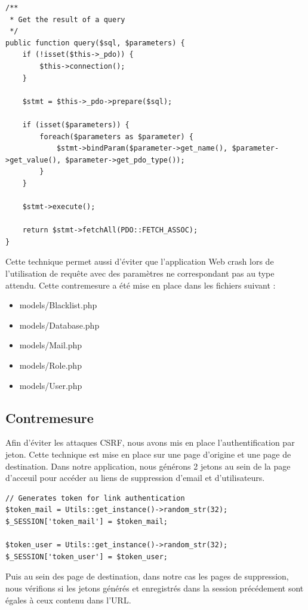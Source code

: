 \documentclass[12pt]{article}
\begin{document}
\begin{lstlisting}[style=JAVA]
/**
 * Get the result of a query
 */
public function query($sql, $parameters) {
    if (!isset($this->_pdo)) {
        $this->connection();
    }

    $stmt = $this->_pdo->prepare($sql);
    
    if (isset($parameters)) {
        foreach($parameters as $parameter) {
            $stmt->bindParam($parameter->get_name(), $parameter->get_value(), $parameter->get_pdo_type());
        }
    }

    $stmt->execute();

    return $stmt->fetchAll(PDO::FETCH_ASSOC);
}
\end{lstlisting}

Cette technique permet aussi d'éviter que l'application Web crash lors de l'utilisation de requête avec des paramètres ne correspondant pas au type attendu.
Cette contremesure a été mise en place dans les fichiers suivant :

\begin{itemize}
\item models/Blacklist.php
\item models/Database.php
\item models/Mail.php
\item models/Role.php
\item models/User.php
\end{itemize}

\newpage
\subsection{Contremesure}\label{c4_1}

Afin d'éviter les attaques CSRF, nous avons mis en place l'authentification par jeton. Cette technique est mise en place sur une page d'origine et une page de destination.
Dans notre application, nous générons 2 jetons au sein de la page d'acceuil pour accéder au liens de suppression d'email et d'utilisateurs.

\begin{lstlisting}[style=JAVA]
// Generates token for link authentication
$token_mail = Utils::get_instance()->random_str(32);
$_SESSION['token_mail'] = $token_mail;

$token_user = Utils::get_instance()->random_str(32);
$_SESSION['token_user'] = $token_user;
\end{lstlisting}

Puis au sein des page de destination, dans notre cas les pages de suppression, nous vérifions si les jetons générés et enregistrés dans la session précédement sont égales à ceux contenu dans l'URL.
\end{document}
